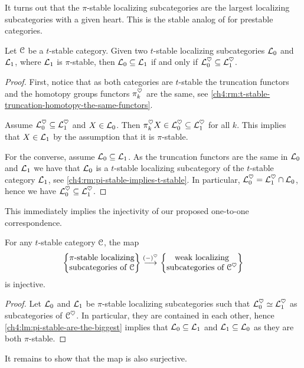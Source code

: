 It turns out that the $\pi$-stable localizing subcategories are the largest localizing subcategories with a given heart. This is the stable analog of \cite[C.5.2.5]{lurie_SAG} for prestable categories. 

\begin{lemma}
    \label{ch4:lm:pi-stable-are-the-biggest}
    Let $\EuScript{C}$ be a $t$-stable category. Given two $t$-stable localizing subcategories $\mathcal{L}_0$ and $\mathcal{L}_1$, where $\mathcal{L}_1$ is $\pi$-stable, then $\mathcal{L}_0 \subseteq \mathcal{L}_1$ if and only if $\mathcal{L}_0^\heartsuit \subseteq \mathcal{L}_1^\heartsuit$. 
\end{lemma}
\begin{proof}
    First, notice that as both categories are $t$-stable the truncation functors and the homotopy groups functors $\pi_k^\heartsuit$ are the same, see \cref{ch4:rm:t-stable-truncation-homotopy-the-same-functors}. 
    
    Assume $\mathcal{L}_0^\heartsuit \subseteq \mathcal{L}_1^\heartsuit$ and $X\in \mathcal{L}_0$. Then $\pi_k^\heartsuit X\in \mathcal{L}_0^\heartsuit \subseteq \mathcal{L}_1^\heartsuit$ for all $k$. This implies that $X\in \mathcal{L}_1$ by the assumption that it is $\pi$-stable. 

    For the converse, assume $\mathcal{L}_0\subseteq \mathcal{L}_1$. As the truncation functors are the same in $\mathcal{L}_0$ and $\mathcal{L}_1$ we have that $\mathcal{L}_0$ is a $t$-stable localizing subcategory of the $t$-stable category $\mathcal{L}_1$, see \cref{ch4:rm:pi-stable-implies-t-stable}. In particular, $\mathcal{L}_0^\heartsuit = \mathcal{L}_1^\heartsuit \cap \mathcal{L}_0$, hence we have $\mathcal{L}_0^\heartsuit \subseteq \mathcal{L}_1^\heartsuit$. 
\end{proof}

This immediately implies the injectivity of our proposed one-to-one correspondence. 

\begin{corollary}
    \label{ch4:cor:pi-stable-heart-injective}
    For any $t$-stable category $\EuScript{C}$, the map
    \[\left\{ \begin{matrix} \pi\text{-stable localizing}\\ \text{subcategories of }\EuScript{C} \end{matrix} \right\}\overset{(-)^\heartsuit}{\longrightarrow} \left\{ \begin{matrix} \text{weak localizing}\\ \text{subcategories of }\EuScript{C}^\heartsuit \end{matrix} \right\}\] 
    is injective. 
\end{corollary}
\begin{proof}
    Let $\mathcal{L}_0$ and $\mathcal{L}_1$ be $\pi$-stable localizing subcategories such that $\mathcal{L}_0^\heartsuit \simeq \mathcal{L}_1^\heartsuit$ as subcategories of $\EuScript{C}^\heartsuit$. In particular, they are contained in each other, hence \cref{ch4:lm:pi-stable-are-the-biggest} implies that $\mathcal{L}_0 \subseteq \mathcal{L}_1$ and $\mathcal{L}_1 \subseteq \mathcal{L}_0$ as they are both $\pi$-stable. 
\end{proof}

It remains to show that the map is also surjective. 

